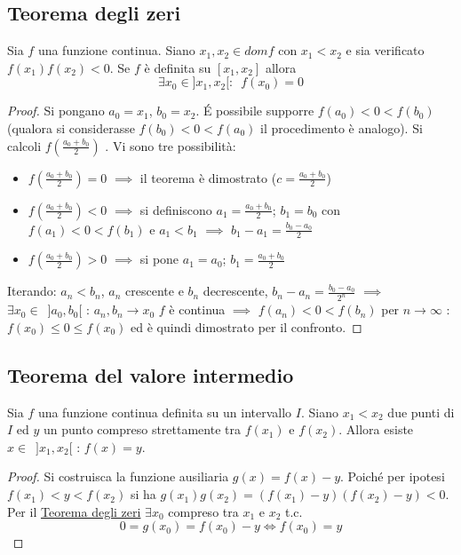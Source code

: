 \documentclass[10pt, oneside]{book}
\theoremstyle{plain}
\begin{document}
\subsection{Teorema degli zeri}
\hypertarget{zeri}{\begin{ther}
Sia $f$ una funzione continua. Siano $x_1, x_2 \in dom f$ con $x_1 < x_2$ e sia verificato $f(x_1) f(x_2) < 0$. Se $f$ è definita su $[x_1, x_2]$ allora \[\exists x_0 \in ]x_1, x_2[ : \enspace f(x_0) = 0\]
\end{ther}}
\begin{proof}
Si pongano $a_0 = x_1$, $b_0 = x_2$. \'E possibile supporre $f(a_0) < 0 < f(b_0)$ (qualora si considerasse $f(b_0) < 0 < f(a_0)$ il procedimento è analogo). \newline Si calcoli $f(\frac{a_0 + b_0}{2})$ . Vi sono tre possibilità:
\begin{itemize}[label=$\square$]
    \item $f(\frac{a_0 + b_0}{2}) = 0$ $\implies$ il teorema è dimostrato ($c = \frac{a_0 + b_0}{2}$)
    \item $f(\frac{a_0 + b_0}{2}) < 0$ $\implies$ si definiscono $a_1 = \frac{a_0 + b_0}{2}$; $b_1 = b_0$ con $f(a_1) < 0 < f(b_1)$ e $a_1 < b_1$ $\implies$ $b_1 - a_1 = \frac{b_0 - a_0}{2}$
    \item $f(\frac{a_0 + b_0}{2}) > 0$ $\implies$ si pone $a_1 = a_0$; $b_1 = \frac{a_0 + b_0}{2}$
\end{itemize}
Iterando: $a_n < b_n$, $a_n$ crescente e $b_n$ decrescente, $b_n - a_n = \frac{b_0 - a_0}{2^n}$ $\implies$ $\exists x_0 \in \enspace ]a_0, b_0[$ : $a_n, b_n \longrightarrow x_0$
\newline $f$ è continua $\implies$ $f(a_n) < 0 < f(b_n)$ per $n \rightarrow \infty$ : $f(x_0) \leq 0 \leq f(x_0)$ ed è quindi dimostrato per il confronto.
\end{proof}

\subsection{Teorema del valore intermedio}
\hypertarget{valint}{\begin{ther}
Sia $f$ una funzione continua definita su un intervallo $I$. Siano $x_1 < x_2$ due punti di $I$ ed $y$ un punto compreso strettamente tra $f(x_1)$ e $f(x_2)$.\newline 
Allora esiste $x \in \enspace ]x_1, x_2[$ : $f(x) = y$.
\end{ther}}
\begin{proof}
Si costruisca la funzione ausiliaria $g(x) = f(x) - y$. Poiché per ipotesi $f(x_1) < y < f(x_2)$ si ha $g(x_1) g(x_2) = (f(x_1) - y)(f(x_2) - y) < 0$. Per il \hyperlink{zeri}{Teorema degli zeri} $\exists x_0$ compreso tra $x_1$ e $x_2$ t.c. 
\[0 = g(x_0) = f(x_0) - y \Longleftrightarrow f(x_0) = y\]
\end{proof}
\end{document}
